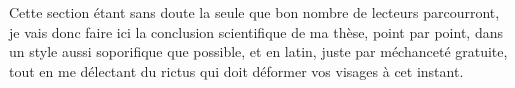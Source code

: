 Cette section étant sans doute la seule que bon nombre de lecteurs parcourront, je vais donc faire ici la conclusion scientifique de ma thèse, point par point, dans un style aussi soporifique que possible, et en latin, juste par méchanceté gratuite, tout en me délectant du rictus qui doit déformer vos visages à cet instant. 








